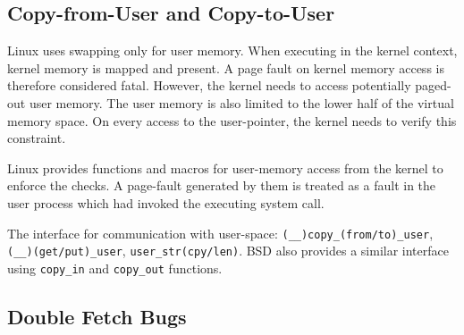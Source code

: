 


\subsection{Copy-from-User and Copy-to-User}
\label{subsec:copy}
Linux uses swapping only for user memory. When executing in the kernel context,
kernel memory is mapped and present. A page fault on kernel memory access is
therefore considered fatal. However, the kernel needs to access potentially
paged-out user memory. The user memory is also limited to the lower half of the
virtual memory space. On every access to the user-pointer, the kernel needs to
verify this constraint.

Linux provides functions and macros for user-memory access from the kernel to 
enforce the checks. A page-fault generated by them is treated as a fault in the
user process which had invoked the executing system call.


The interface for communication with user-space: \texttt{(\_\_)copy\_(from/to)\_user},
\texttt{(\_\_)(get/put)\_user}, \texttt{user\_str(cpy/len)}.
BSD also provides a similar interface using \texttt{copy\_in} and 
\texttt{copy\_out} functions.

\subsection{Double Fetch Bugs}
\label{subsec:doublefetch}

